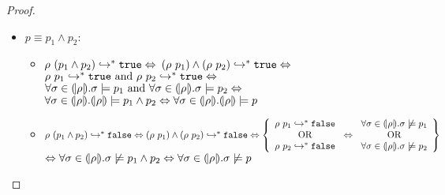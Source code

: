 \begin{proof}
\begin{itemize}
\item $ p \equiv p_1 \land p_2$:
\begin{itemize}
\item
$
	\rho\ (p_1 \land p_2) \hookrightarrow_{}^{*} \mathtt{true} \Leftrightarrow
$
$	
	(\rho\ p_1) \land (\rho\ p_2)  \hookrightarrow_{}^{*} \mathtt{true} \Leftrightarrow
$
$	\evals{\rho\ p_1}{\etrue} \text{ and } \evals{\rho\ p_2}{\etrue} \Leftrightarrow
$\\
$
	{\forall\sigma\in(\!|\rho|\!). \sigma\models p_1} \text{ and } 
	{\forall\ensuremath{\sigma}\in\ensuremath{(\!|\rho|\!)}. \ensuremath{\sigma}\models p_2} \Leftrightarrow
$\\
$	
	{\forall\sigmamodel\in\instance{\rho}. \instance{\rho}\models p_1 \land p_2}  \Leftrightarrow
	\forall\sigmamodel\in\instance{\rho}. \instance{\rho}  \models p		 		
$
\item
$
	\rho\ (p_1 \land p_2) \hookrightarrow_{}^{*} \mathtt{false} \Leftrightarrow
	(\rho\ p_1) \land (\rho\ p_2)  \hookrightarrow_{}^{*} \mathtt{false} \Leftrightarrow
	\left\{
	\begin{array}{c}
		\rho\ p_1 \hookrightarrow_{}^{*} \mathtt{false} \\
		 \text{OR}\\
		\rho\ p_2 \hookrightarrow_{}^{*} \mathtt{false} \\
	\end{array}
	\right.
	\Leftrightarrow
	\left.
	\begin{array}{c}
		{\forall\ensuremath{\sigma}\in\ensuremath{(\!|\rho|\!)}. \ensuremath{\sigma}\not\models p_1} \\
		 \text{OR}\\
		{\forall\sigma\in(\!|\rho|\!). \sigma\not\models p_2} \\
	\end{array}
	\right\}
$\\
$	
	  \Leftrightarrow
	{\forall\ensuremath{\sigma}\in\ensuremath{(\!|\rho|\!)}. \ensuremath{\sigma}\not\models p_1 \land p_2}  \Leftrightarrow
	\forall\sigma\in(\!|\rho|\!). \sigma \not\models p		 		
$
\end{itemize}


\end{itemize}
\end{proof}

